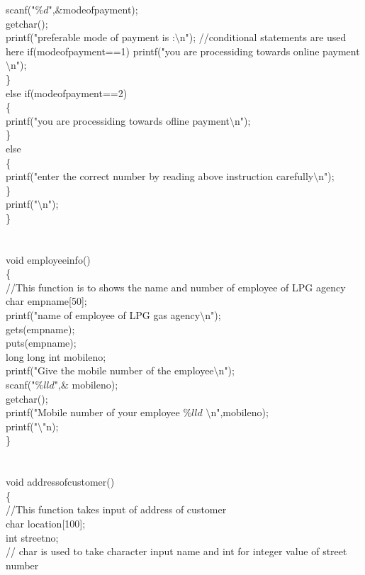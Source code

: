 \documentclass{article}
\begin{document}
	scanf("$\%d$",$\&$modeofpayment);\\
	getchar();\\
	printf("preferable mode of payment is :$\setminus$n");
	//conditional statements are used here
	if(modeofpayment==1){
		printf("you are processiding towards online payment$\setminus$n");\\
	\}\\
	else if(modeofpayment==2)\\
	\{\\
		printf("you are processiding towards ofline payment$\setminus$n");\\
	\}\\
	else\\
	\{\\
		printf("enter the correct number by reading above instruction carefully$\setminus$n");\\
	\}\\
	printf("$\setminus$n");\\
\}\\
\\
\\
void employeeinfo()\\
\{\\
	//This function is to shows the name and number of employee of LPG agency\\
	char empname[50];\\
	printf("name of employee of LPG gas agency$\setminus$n");\\
	gets(empname);\\
	puts(empname);\\
	long long int mobileno;\\
	printf("Give the mobile number of the employee$\setminus$n");\\
	scanf("$\%lld$",$\&$ mobileno);\\
	getchar();\\
	printf("Mobile number of your employee $\%lld$ $\setminus$n",mobileno);\\
	printf("$\setminus$"n);\\
\}\\
\\
\\
void addressofcustomer()\\
\{\\
	//This function takes input of address of customer\\
	char location[100];\\
	int streetno;\\
   // char is used to take character input name and int for integer value of street number\\
}
\end{document}
